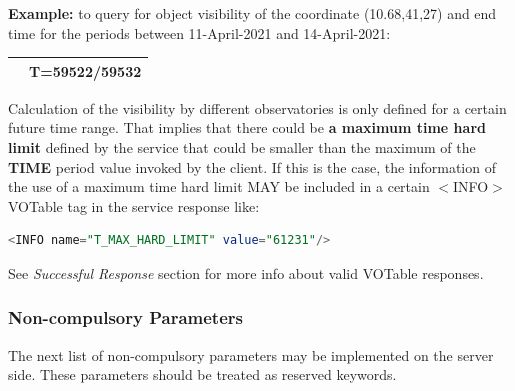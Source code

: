 \documentclass[11pt,a4paper]{ivoatex/ivoa}
\begin{document}
\begin{itemize}
{\textbf{Example:} to query for object visibility of the coordinate
(10.68,41,27) and end time for the periods between 11-April-2021 and 
14-April-2021:
\begin{table}[h]
\centering
\begin{tabular}{|l|l|}
\hline
\begin{lstlisting}[language=SQL]
http://xmmvischeck.esac.esa.int:8080/objvissap/query?
POS=10.68,41.27&T=59522/59532
\end{lstlisting}
\\
\hline
\end{tabular}
\end{table}

Calculation of the visibility by different observatories is only defined
for a certain future time range. That implies that there could be
\textbf{a maximum time hard limit} defined by the service that could be
smaller than the maximum of the \textbf{TIME} period value invoked by
the client. If this is the case, the information of the use of a maximum
time hard limit MAY be included in a certain $<$INFO$>$ VOTable tag in 
the service response like:
\begin{lstlisting}[language=SQL]
<INFO name="T_MAX_HARD_LIMIT" value="61231"/>
\end{lstlisting}
}
\end{itemize}

See \textit{Successful Response} section for more info about valid
VOTable res\-pon\-ses.

\subsubsection{Non-compulsory Parameters}
The next list of non-compulsory parameters may be implemented on the
server side. These parameters should be treated as reserved keywords.
\end{document}
